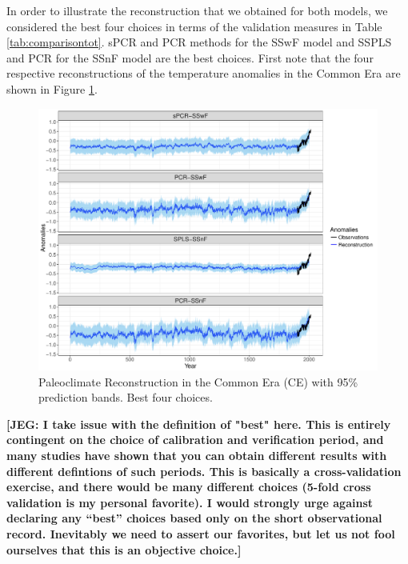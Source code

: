 \documentclass[11pt]{amsart}
\theoremstyle{plain}
\theoremstyle{definition}
\theoremstyle{remark}
\newcommand{\jeg}[1]{\color{ProcessBlue}\textbf{[JEG: #1]}\normalcolor}
\begin{document}
In order to illustrate the reconstruction that we obtained for both models, we
considered the best four choices in terms of the validation measures in Table
\ref{tab:comparisontot}. sPCR and PCR methods for the SSwF model and SSPLS and
PCR for
the SSnF model are the best choices. First note that the four respective reconstructions of the
temperature anomalies in the Common Era are shown in
Figure \ref{fig:paleoCE1}.
\begin{figure}
  \centering
  \includegraphics[scale=0.55]{RecCE_Final}
  \caption{Paleoclimate Reconstruction in the Common Era (CE) with 95\%
    prediction bands. Best four choices.}
  \label{fig:paleoCE1}
\end{figure}

\jeg{I take issue with the definition of "best" here. This is entirely contingent on the choice of calibration and verification period, and many studies have shown that you can obtain different results with different defintions of such periods. This is basically a cross-validation exercise, and there would be many different choices (5-fold cross validation is my personal favorite). I would strongly urge against declaring any ``best'' choices based only on the short observational record. Inevitably we need to assert our favorites, but let us not fool ourselves that this is an objective choice.}
\end{document}
